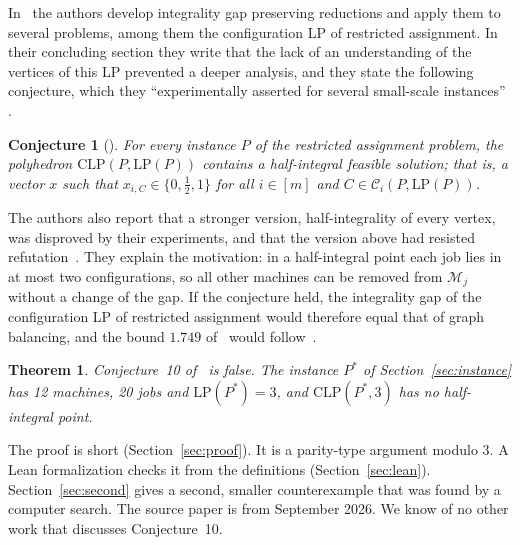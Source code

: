 \documentclass[11pt]{article}
\newtheorem{theorem}{Theorem}
\newtheorem{conjecture}{Conjecture}
\theoremstyle{remark}
\newcommand{\cC}{\mathcal{C}}
\newcommand{\cM}{\mathcal{M}}
\newcommand{\CLP}{\mathrm{CLP}}
\newcommand{\LP}{\mathrm{LP}}
\begin{document}
In~\cite{EMV} the authors develop integrality gap preserving reductions
and apply them to several problems, among them the configuration LP of
restricted assignment. In their concluding section they write that the
lack of an understanding of the vertices of this LP prevented a deeper
analysis, and they state the following conjecture, which they
``experimentally asserted for several small-scale instances''
\cite[p.~23:10]{EMV}.

\begin{conjecture}[{\cite[Conjecture~10]{EMV}}]
For every instance $P$ of the restricted assignment problem, the
polyhedron $\CLP(P,\LP(P))$ contains a half-integral feasible solution;
that is, a vector $x$ such that $x_{i,C}\in\{0,\frac12,1\}$ for all
$i\in[m]$ and $C\in\cC_i(P,\LP(P))$.
\end{conjecture}

The authors also report that a stronger version, half-integrality of
every vertex, was disproved by their experiments, and that the version
above had resisted refutation~\cite[p.~23:10]{EMV}. They explain the
motivation: in a half-integral point each job lies in at most two
configurations, so all other machines can be removed from $\cM_j$
without a change of the gap. If the conjecture held, the integrality gap
of the configuration LP of restricted assignment would therefore equal
that of graph balancing, and the bound $1.749$ of~\cite{JR18} would
follow~\cite[p.~23:10]{EMV}.

\begin{theorem}\label{thm:main}
Conjecture~10 of~\cite{EMV} is false. The instance $P^\ast$ of
Section~\ref{sec:instance} has 12 machines, 20 jobs and $\LP(P^\ast)=3$,
and $\CLP(P^\ast,3)$ has no half-integral point.
\end{theorem}

The proof is short (Section~\ref{sec:proof}). It is a parity-type
argument modulo 3. A Lean formalization checks it from the definitions
(Section~\ref{sec:lean}). Section~\ref{sec:second} gives a second, smaller
counterexample that was found by a computer search. The source paper is
from September 2026. We know of no other work that discusses
Conjecture~10.
\end{document}
